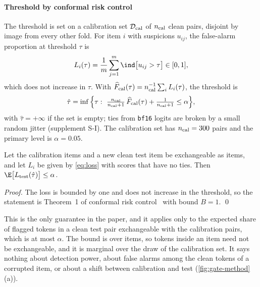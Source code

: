\paragraph*{Threshold by conformal risk control}
The threshold is set on a calibration set $\mathcal D_{\rm cal}$ of $n_{\rm cal}$ clean pairs, disjoint by image from every other fold.
For item $i$ with suspicions $u_{ij}$, the false-alarm proportion at threshold $\tau$ is
\begin{equation}
L_i(\tau)=\frac1m\sum_{j=1}^{m}\ind\big[u_{ij}>\tau\big]\in[0,1],
\label{eq:loss}
\end{equation}
which does not increase in $\tau$.
With $\widehat F_{\rm cal}(\tau)=n_{\rm cal}^{-1}\sum_iL_i(\tau)$, the threshold is
\begin{equation}
\hat\tau=\inf\Big\{\tau:\ \tfrac{n_{\rm cal}}{n_{\rm cal}+1}\,\widehat F_{\rm cal}(\tau)+\tfrac1{n_{\rm cal}+1}\le\alpha\Big\},
\label{eq:crc}
\end{equation}
with $\hat\tau=+\infty$ if the set is empty; ties from \texttt{bf16} logits are broken by a small random jitter (supplement S-I).
The calibration set has $n_{\rm cal}=300$ pairs and the primary level is $\alpha=0.05$.

\begin{proposition}\label{prop:crc}
Let the calibration items and a new clean test item be exchangeable as items, and let $L_i$ be given by \cref{eq:loss} with scores that
have no ties. Then $\E\big[L_{\rm test}(\hat\tau)\big]\le\alpha$.
\end{proposition}
\noindent\emph{Proof.} The loss is bounded by one and does not increase in the threshold, so the statement is Theorem~1 of conformal
risk control~\cite{angelopoulos2024crc} with bound $B=1$. \qed

This is the only guarantee in the paper, and it applies only to the expected share of flagged tokens in a clean test pair exchangeable
with the calibration pairs, which is at most $\alpha$.
The bound is over items, so tokens inside an item need not be exchangeable, and it is marginal over the draw of the calibration set.
It says nothing about detection power, about false alarms among the clean tokens of a corrupted item, or about a shift between
calibration and test (\cref{fig:gate-method}(a)).


